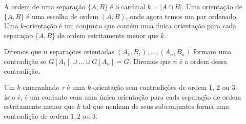 \documentclass[11pt]{article}
\renewcommand{\textit}[1]{{\fakeitalic#1}}
\theoremstyle{definition}
\theoremstyle{definition}
\theoremstyle{definition}
\theoremstyle{definition}
\theoremstyle{definition}
\theoremstyle{definition}
\theoremstyle{definition}
\theoremstyle{definition}
\newtheorem*{definition*}{Definição}
\newenvironment{definicao*}{
\definecolor{shadecolor}{HTML}{defcfc}
\begin{shaded}
\begin{definition*}
}
{
\end{definition*}
\end{shaded}
}
\theoremstyle{definition}
\theoremstyle{definition}
\theoremstyle{definition}
\theoremstyle{definition}
\begin{document}
\begin{definicao*}

A \textit{ordem} de uma separação $\{A,B\}$ é o cardinal $k = |A \cap B|$. Uma \textit{orientação de }$\{A,B\}$ é uma escolha de ordem $(A,B)$, onde agora temos um par ordenado. Uma $k$\textit{-orientação} é um conjunto que contém uma única orientação para cada separação $\{A,B\}$ de ordem estritamente menor que $k$.

Diremos que $n$ separações orientadas $(A_1,B_1), \dots, (A_n, B_n)$ formam uma \textit{contradição} se $G[A_1] \cup \dots \cup G[A_n] = G$. Diremos que $n$ é a ordem dessa contradição.

Um $k$-\textit{emaranhado} $\tau$ é uma $k$-orientação sem contradições de ordem $1$, $2$ ou $3$. Isto é, é um conjunto com uma única orientação para cada separação de ordem estritamente menor que $k$ tal que nenhum de seus subconjuntos forma uma contradição de ordem $1,2$ ou $3$.
\end{definicao*}
\end{document}

